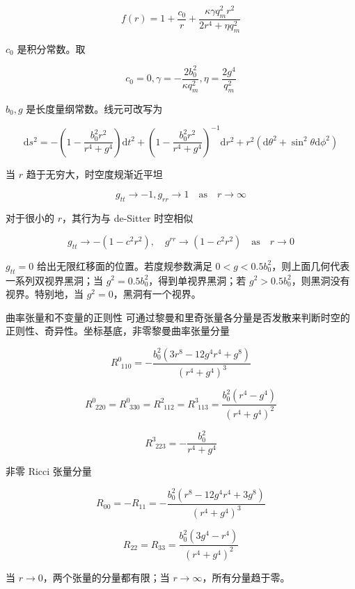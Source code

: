 \documentclass[9pt, dvipsnames]{beamer} %
\begin{document}
\begin{frame}
    $$
    f(r)
    =1+\frac{c_0 }{r } + \frac{\kappa \gamma q_m^2 r^2 }{2r^4+\eta q_m^2 } 
    $$
    
    $c_0 $ 是积分常数。取
    
    $$
    c_0=0,
    \gamma=-\frac{2b_0^2 }{\kappa q_m^2} ,
    \eta=\frac{2g^4 }{q_m^2 }
    $$
    
    $b_0,g $ 是长度量纲常数。线元可改写为
    
    $$
    \mathrm{d}s^2
    =-\left(1-\frac{b_0^2r^2 }{r^4+g^4 }  \right)\mathrm{d}t^2 + \left(1-\frac{b_0^2r^2 }{r^4+g^4 }  \right)^{-1}\mathrm{d}r^2 + r^2\left(\mathrm{d}\theta^2+\sin^2\theta \mathrm{d}\phi^2 \right)
    $$
    
    当 $r$ 趋于无穷大，时空度规渐近平坦
    
    $$
    g_{tt}\to -1,g_{rr}\to 1 \quad \mathrm{as}\quad r\to\infty
    $$
    
    对于很小的 $r$，其行为与 de-Sitter 时空相似
    
    $$
    g_{tt}\to -\left(1-c^2r^2 \right),\quad g^{rr} \to \left(1-c^2r^2 \right)\quad \mathrm{as}\quad r\to 0
    $$
    
    $g_{tt}=0$ 给出无限红移面的位置。若度规参数满足 $0<g<0.5 b_0^2 $，则上面几何代表一系列双视界黑洞；当 $g^2=0.5b_0^2$，得到单视界黑洞；若 $g^2>0.5b_0^2$，则黑洞没有视界。特别地，当 $g^2=0$，黑洞有一个视界。
\end{frame}

\begin{frame}{曲率张量和不变量的正则性}
    可通过黎曼和里奇张量各分量是否发散来判断时空的正则性、奇异性。坐标基底，非零黎曼曲率张量分量

    $$
    R^0_{~~ 110} 
    =-\frac{b_0^2\left(3r^8 - 12 g^4 r^4 + g^8 \right) }{\left(r^4+g^4 \right)^3 } 
    $$
    
    $$
    R^0_{~~220} = R^0_{~~330} = R^2_{~~112} = R^3_{~~113}
    =\frac{b_0^2\left(r^4-g^4 \right) }{\left(r^4+g^4 \right)^2 }
    $$
    
    $$
    R^3_{~~223}
    =-\frac{b_0^2 }{r^4+g^4 } 
    $$
    
    非零 Ricci 张量分量
    
    $$
    R_{00} = -R_{11} = -\frac{b_0^2\left(r^8-12g^4r^4+3g^8 \right) }{\left(r^4+g^4 \right)^3 } 
    $$
    
    $$
    R_{22} = R_{33} = \frac{b_0^2 \left(3g^4-r^4 \right) }{\left(r^4+g^4 \right)^2 }
    $$
    
    当 $r\to 0 $，两个张量的分量都有限；当 $r\to \infty $，所有分量趋于零。
\end{frame}
\end{document}
